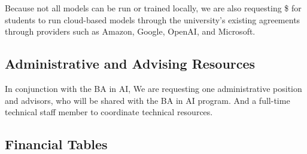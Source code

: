 Because not all models can be run or trained locally, we are also requesting \$\cloud{} for students to run cloud-based models through the university's existing agreements through providers such as Amazon, Google, OpenAI, and Microsoft.

\subsection{Administrative and Advising Resources}



In conjunction with the BA in AI, We are requesting one administrative position and \advisors{} advisors, who will be shared with the BA in AI program.  And a full-time technical staff member to coordinate technical resources.

\subsection{Financial Tables}
